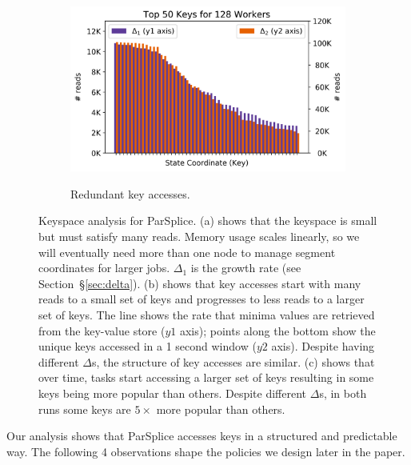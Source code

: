 \begin{figure}[t]
\begin{subfigure}[b]{.32\linewidth}
{    \label{fig:motivation-regimes}}
  \end{subfigure}
  \begin{subfigure}[b]{.32\linewidth}
    \includegraphics[width=1.05\textwidth]{figures/methodology-keys.png}\\
    \caption{Redundant key accesses.
    \label{fig:methodology-keys}}
  \end{subfigure}
  \caption{Keyspace analysis for ParSplice.
    (a) shows that the keyspace is small but must satisfy many reads. Memory
    usage scales linearly, so we will eventually need more than one node to manage
    segment coordinates for larger jobs. \(\Delta_1\) is the growth rate (see
    Section~\S\ref{sec:delta}).
    (b) shows that key accesses start with many reads to a small set of
    keys and progresses to less reads to a larger set of keys.  The line shows the
    rate that minima values are retrieved from the key-value store (\(y1\) axis);
    points along the bottom show the unique keys accessed in a 1
    second window (\(y2\) axis). Despite having different
    \(\Delta\)s, the structure of key accesses are similar.
    (c) shows that over time, tasks start accessing a larger set of keys resulting in
    some keys being more popular than others.  Despite different
    \(\Delta\)s, in both runs some keys are \(5\times\) more popular than others.
  }
\end{figure}

Our analysis shows that ParSplice accesses keys in a structured and predictable
way. The following 4 observations shape the policies we design later in the
paper.

